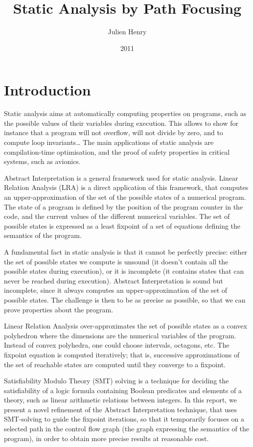 \documentclass[a4paper,english,titlepage,11pt]{report}
\title{Static Analysis by Path Focusing}
\author{Julien Henry}
\date{2011}
\institute{Grenoble-INP}
\begin{document}
  
  \maketitlepage

  \tableofcontents
  
  \newpage



\chapter{Introduction} 

Static analysis aims at automatically computing properties on programs, such as
the possible values of their variables during execution. This allows to show for
instance that a program will not overflow, will not divide by zero, and to compute
loop invariants\dots
The main applications of static analysis are compilation-time optimisation, and
the proof of safety properties in critical systems, such as avionics.

Abstract Interpretation is a general framework used for static analysis.
Linear Relation Analysis (LRA) is a direct application of this framework, that
computes an upper-approximation of the set of the possible states of a numerical
program. The state of a program is defined by the position of the program
counter in the code, and the current values of the different numerical variables.
The set of possible states is expressed as a least fixpoint of a set of
equations defining the semantics of the program. 

A fundamental fact in static analysis is that it cannot be perfectly precise:
either the set of possible states we compute is unsound (it doesn't contain all
the possible states during execution), or it is incomplete (it contains
states that can never be reached during execution). 
Abstract Interpretation is sound but incomplete, since it always computes an
upper-approximation of the set of possible states. The challenge is then to be
as precise as possible, so that we can prove properties about the program.

Linear Relation Analysis over-approximates the set of possible states as a
convex polyhedron where the dimensions are the numerical variables of the
program.
Instead of convex polyhedra, one could choose intervals, octagons, etc.
The fixpoint equation is computed iteratively; that is, successive
approximations of the set of reachable states are computed until they converge
to a fixpoint. 

Satisfiability Modulo Theory (SMT) solving is a technique
for deciding the satisfiability of a logic formula containing Boolean
predicates and elements of a theory, such as linear arithmetic relations between
integers.
In this report, we present a novel refinement of the Abstract Interpretation
technique, that uses SMT-solving to guide the fixpoint iterations, so that it
temporarily focuses on a selected path in the control flow graph (the graph
expressing the semantics of the program), in order to
obtain more precise results at reasonable cost.
\end{document}
